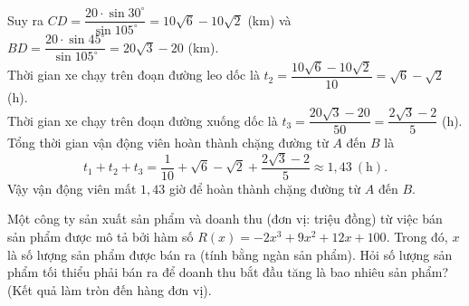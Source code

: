 \begin{bt}
{		Suy ra $CD=\dfrac{20\cdot \sin  30^\circ}{\sin 105^\circ}=10\sqrt{6}-10\sqrt{2}$ (km) và $BD=\dfrac{20\cdot \sin 45^\circ}{\sin 105^\circ}=20\sqrt{3}-20$ (km).\\
		 Thời gian xe chạy trên đoạn đường leo dốc là $t_2=\dfrac{10\sqrt{6}-10\sqrt{2}}{10}=\sqrt{6}-\sqrt{2}$ (h).\\
		Thời  gian xe chạy trên đoạn đường xuống dốc là $t_3=\dfrac{20\sqrt{3}-20}{50}=\dfrac{2\sqrt{3}-2}{5}$ (h).\\
		Tổng thời gian vận động viên hoàn  thành chặng đường từ $A$ đến $B$ là
		 \[t_1+t_2+t_3=\dfrac{1}{10}+\sqrt{6}-\sqrt{2}+\dfrac{2\sqrt{3}-2}{5}\approx 1{,}43 \mathrm{~(h)}.\]
		Vậy vận động viên mất $1{,}43$ giờ để hoàn thành chặng đường từ $A$  đến $B$.
	 }
\end{bt}

\begin{bt}%
	Một công ty sản xuất sản phẩm và doanh thu (đơn vị: triệu đồng) từ việc bán sản phẩm được mô tả bởi hàm số $R(x)=-2x^3+9x^2+12x+100$. Trong đó, $x$ là số lượng sản phẩm được bán ra (tính bằng ngàn sản phẩm). Hỏi số lượng sản phẩm tối thiểu phải bán ra để doanh thu bắt đầu tăng là bao nhiêu sản phẩm? (Kết quả làm tròn đến  hàng đơn vị).
\end{bt}

